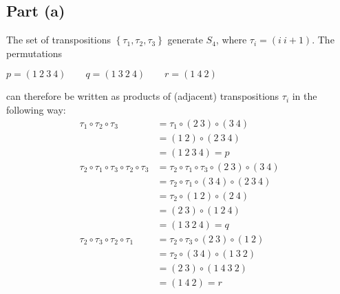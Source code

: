 \documentclass{article}
\begin{document}
\subsection*{Part (a)}
The set of transpositions $\left\{\tau_1,\tau_2,\tau_3\right\}$ generate $S_4$, where $\tau_i = \left(i~ i+1\right)$. The permutations
\begin{center}
    $p = \left(1~2~3~4\right)
    \qquad
    q = \left(1~3~2~4\right)
    \qquad
    r = \left(1~4~2\right)
    $
\end{center}
can therefore be written as products of (adjacent) transpositions $\tau_i$ in the following way:
\begin{equation}
    \begin{split}
        \tau_1 \circ \tau_2 \circ \tau_3 & = \tau_1 \circ \left(2~3\right) \circ \left(3~4\right) \\
        & = \left(1~2\right) \circ \left(2~3~4\right) \\
        & = \left(1~2~3~4\right) = p \\
        \tau_2 \circ \tau_1 \circ \tau_3 \circ \tau_2 \circ \tau_3 & = \tau_2 \circ \tau_1 \circ \tau_3 \circ \left(2~3\right) \circ \left(3~4\right) \\
        & = \tau_2 \circ \tau_1 \circ \left(3~4\right) \circ \left(2~3~4\right) \\
        & = \tau_2 \circ \left(1~2\right) \circ \left(2~4\right) \\
        & = \left(2~3\right) \circ \left(1~2~4\right) \\
        & = \left(1~3~2~4\right) = q \\
        \tau_2 \circ \tau_3 \circ \tau_2 \circ \tau_1 & = \tau_2 \circ \tau_3 \circ \left(2~3\right) \circ \left(1~2\right) \\
        & = \tau_2 \circ \left(3~4\right) \circ \left(1~3~2\right) \\
        & = \left(2~3\right) \circ \left(1~4~3~2\right) \\
        & = \left(1~4~2\right) = r
    \end{split}
\end{equation} 
\end{document}

